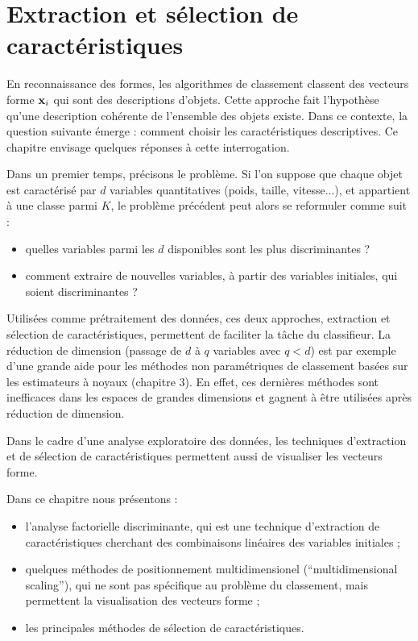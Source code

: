 \nocite{Gallinari1988}

\chapter{Extraction et s\'election de caract\'eristiques}
En reconnaissance des formes, les algorithmes de classement 
classent des vecteurs forme $\mbox{\bf x}_i$ qui sont des descriptions 
d'objets. Cette approche fait l'hypoth\`ese qu'une 
description coh\'erente de l'ensemble des objets existe. Dans ce contexte, la
question suivante \'emerge : comment choisir les caract\'eristiques
descriptives. Ce chapitre envisage quelques r\'eponses \`a cette
interrogation.

Dans un premier temps, pr\'ecisons le probl\`eme. Si l'on suppose 
que chaque objet est caract\'eris\'e par $d$ variables
quantitatives (poids, taille, vitesse...), et appartient
\`a une classe parmi $K$,  le probl\`eme pr\'ec\'edent peut 
alors se reformuler comme suit :
\begin{itemize}
\item quelles variables parmi les $d$ disponibles sont les 
plus discriminantes ?
\item comment extraire de nouvelles variables, \`a partir des
variables initiales, qui soient discriminantes ? 
\end{itemize}
Utilis\'ees comme pr\'etraitement des donn\'ees, ces deux approches, 
extraction  et s\'election de caract\'eristiques,
permettent de faciliter la t\^ache du classifieur. La r\'eduction
de dimension (passage de $d$ \`a $q$ variables avec $q<d$) est
par exemple d'une grande aide pour les m\'ethodes non param\'etriques
de classement bas\'ees sur les estimateurs \`a noyaux (chapitre 3). En
effet, ces derni\`eres m\'ethodes sont inefficaces dans les espaces
de grandes dimensions et gagnent \`a \^etre utilis\'ees apr\`es 
r\'eduction de dimension. 

Dans le cadre d'une analyse exploratoire  des donn\'ees, les techniques
d'extraction et de s\'election de caract\'eristiques permettent aussi
de visualiser les vecteurs forme. 

Dans ce chapitre nous pr\'esentons :
\begin{itemize}
\item l'analyse factorielle discriminante, qui est une technique
d'extraction de caract\'eristiques cherchant des combinaisons lin\'eaires
des variables initiales ;
\item quelques m\'ethodes de positionnement multidimensionel (``multidimensional scaling''),
qui ne sont pas sp\'ecifique au probl\`eme du classement, mais permettent
la visualisation des vecteurs forme ;
\item les principales  m\'ethodes de s\'election de caract\'eristiques.
\end{itemize}
 


